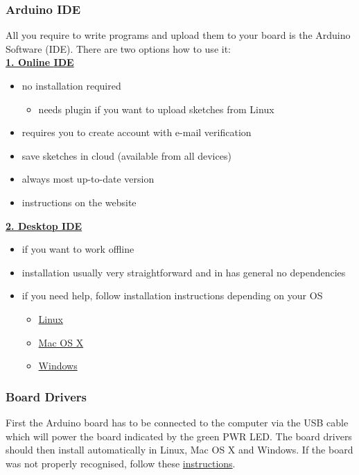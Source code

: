 \subsubsection{Arduino \ac{IDE}}
All you require to write programs and upload them to your board is the Arduino Software (\ac{IDE}). There are two options how to use it:\\[5pt]
\href{https://create.arduino.cc}{\textbf{1. Online \ac{IDE}}}
\begin{itemize}
	\item no installation required
	\begin{itemize}
		\item needs plugin if you want to upload sketches from Linux
	\end{itemize}
	\item requires you to create account with e-mail verification
	\item save sketches in cloud (available from all devices)
	\item always most up-to-date version
	\item instructions on the website
\end{itemize}
\href{https://www.arduino.cc/en/Main/Software#download}{\textbf{2. Desktop \ac{IDE}}}
\begin{itemize}
	\item if you want to work offline
	\item installation usually very straightforward and in has general no dependencies
	\item if you need help, follow installation instructions depending on your \ac{OS}
	\begin{itemize}
		\item \href{https://www.arduino.cc/en/Guide/Linux}{Linux}
		\item \href{https://www.arduino.cc/en/Guide/MacOSX}{Mac OS X}
		\item \href{https://www.arduino.cc/en/Guide/Windows}{Windows}
	\end{itemize}

\end{itemize}

\subsubsection{Board Drivers}
First the Arduino board has to be connected to the computer via the \ac{USB} cable which will power the board indicated by the green \ac{PWR} LED. The board drivers should then install automatically in Linux, Mac OS X and Windows. If the board was not properly recognised, follow these \href{https://www.arduino.cc/en/Guide/ArduinoUno}{instructions}.

